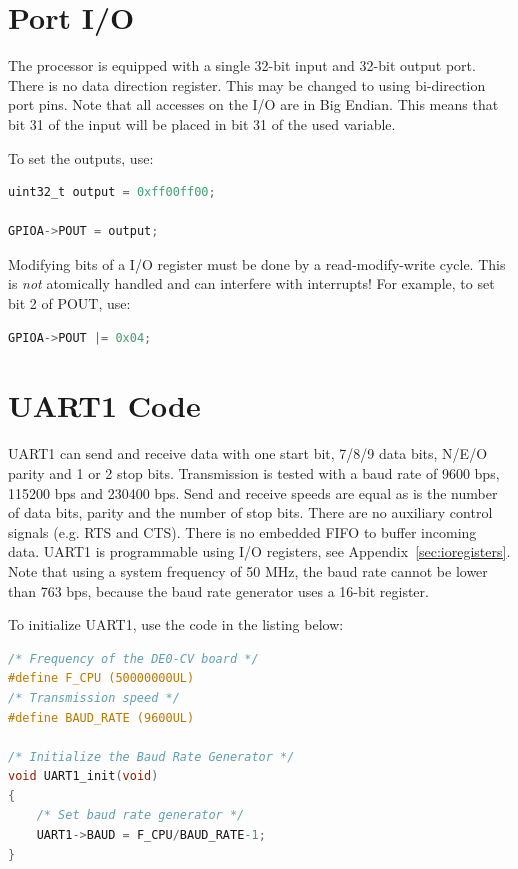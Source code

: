 \documentclass[12pt]{article}
\begin{document}
\section{Port I/O}
The processor is equipped with a single 32-bit input and 32-bit output port. There is no data direction register. This may be changed to using bi-direction port pins. Note that all accesses on the I/O are in Big Endian. This means that bit 31 of the input will be placed in bit 31 of the used variable.

To set the outputs, use:

\begin{lstlisting}[language=C]
uint32_t output = 0xff00ff00;

GPIOA->POUT = output;
\end{lstlisting}

Modifying bits of a I/O register must be done by a read-modify-write cycle. This is \emph{not} atomically handled and can interfere with interrupts! For example, to set bit 2 of POUT, use:

\begin{lstlisting}[language=C]
GPIOA->POUT |= 0x04;
\end{lstlisting}

\section{UART1 Code}

UART1 can send and receive data with one start bit, 7/8/9 data bits, N/E/O parity and 1 or 2 stop bits. Transmission is tested with a baud rate of 9600 bps, 115200 bps and 230400 bps. Send and receive speeds are equal as is the number of data bits, parity and the number of stop bits. There are no auxiliary control signals (e.g. RTS and CTS). There is no embedded FIFO to buffer incoming data. UART1 is programmable using I/O registers, see Appendix~\ref{sec:ioregisters}. Note that using a system frequency of 50 MHz, the baud rate cannot be lower than 763 bps, because the baud rate generator uses a 16-bit register.

To initialize UART1, use the code in the listing below:

\begin{lstlisting}[language=C]
/* Frequency of the DE0-CV board */
#define F_CPU (50000000UL)
/* Transmission speed */
#define BAUD_RATE (9600UL)

/* Initialize the Baud Rate Generator */
void UART1_init(void)
{
    /* Set baud rate generator */
    UART1->BAUD = F_CPU/BAUD_RATE-1;
}
\end{lstlisting}
\end{document}
